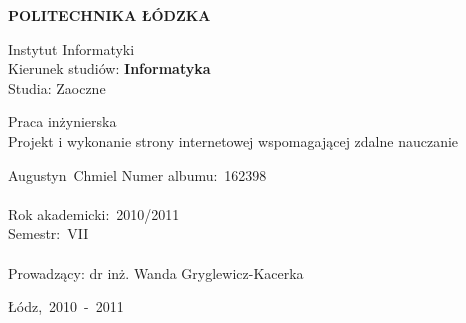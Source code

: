\thispagestyle{empty}
\begin{center}
\textbf{POLITECHNIKA ŁÓDZKA}
\end{center}
\begin{flushleft}
Instytut Informatyki \\
Kierunek studiów: \textbf{Informatyka} \\
Studia: Zaoczne \\
\end{flushleft}
\vspace{4cm}
\begin{center}
Praca inżynierska \\
Projekt i wykonanie strony internetowej wspomagającej zdalne nauczanie \\
\end{center}
\smallskip
\begin{flushleft}
Augustyn~Chmiel \newline
Numer albumu:~162398 \\
\ \\
Rok akademicki:~2010/2011 \\
Semestr:~VII \\
\ \\
Prowadzący:\hspace{1.5cm} dr inż. Wanda Gryglewicz-Kacerka \\
\end{flushleft}
\vspace{8cm}
\begin{center}
Łódz,~2010~-~2011
\end{center}
\newpage
